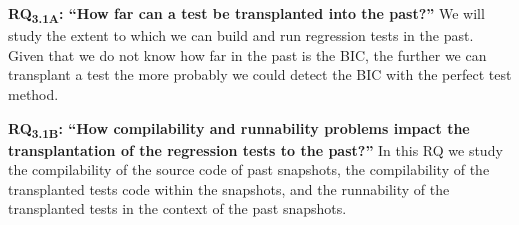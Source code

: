 \newcommand{\rqonea}[0]{RQ\textsubscript{3.1A}: ``How far can a test be transplanted into the past?''}
\textbf{\rqonea} 
We will study the extent to which we can build and run regression tests in the past. Given that we do not know how far in the past is the BIC, the further we can transplant a test the more probably we could detect the BIC with the perfect test method.

\newcommand{\rqoneb}[0]{RQ\textsubscript{3.1B}: ``How compilability and runnability problems impact the transplantation of the regression tests to the past?''}
\textbf{\rqoneb}
In this RQ we study the compilability of the source code of past snapshots, the compilability of the transplanted tests code within the snapshots, and the runnability of the transplanted tests in the context of the past snapshots. 

